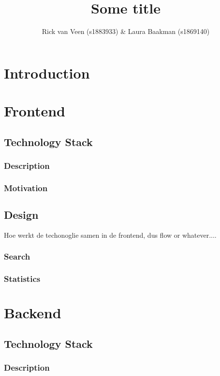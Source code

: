 \documentclass{report}
\title{Some title}
\author{Rick van Veen (s1883933) \& Laura Baakman (s1869140)}
\begin{document}
\maketitle

\chapter*{Introduction}

\chapter{Frontend}

\section{Technology Stack}

\subsection{Description}

\subsection{Motivation}

\section{Design}
Hoe werkt de techonoglie samen in de frontend, dus flow or whatever....

\subsection{Search}

\subsection{Statistics}

\chapter{Backend}

\section{Technology Stack}

\subsection{Description}
\end{document}
